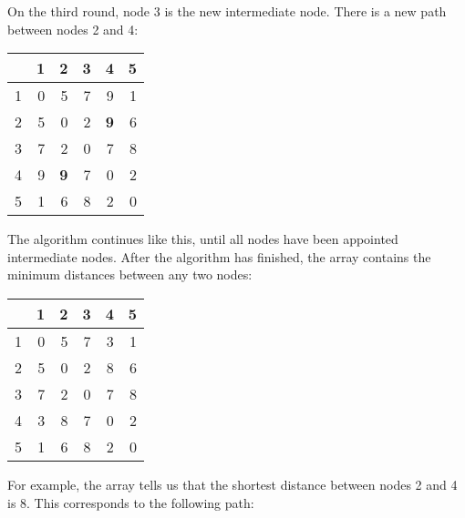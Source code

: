 On the third round, node 3 is the new intermediate node.
There is a new path between nodes 2 and 4:

\begin{center}
\begin{tabular}{r|rrrrr}
 & 1 & 2 & 3 & 4 & 5 \\
\hline
1 & 0 & 5 & 7 & 9 & 1 \\
2 & 5 & 0 & 2 & \textbf{9} & 6 \\
3 & 7 & 2 & 0 & 7 & 8 \\
4 & 9 & \textbf{9} & 7 & 0 & 2 \\
5 & 1 & 6 & 8 & 2 & 0 \\
\end{tabular}
\end{center}
\vspace{10pt}

The algorithm continues like this,
until all nodes have been appointed intermediate nodes.
After the algorithm has finished, the array contains
the minimum distances between any two nodes:

\begin{center}
\begin{tabular}{r|rrrrr}
 & 1 & 2 & 3 & 4 & 5 \\
\hline
1 & 0 & 5 & 7 & 3 & 1 \\
2 & 5 & 0 & 2 & 8 & 6 \\
3 & 7 & 2 & 0 & 7 & 8 \\
4 & 3 & 8 & 7 & 0 & 2 \\
5 & 1 & 6 & 8 & 2 & 0 \\
\end{tabular}
\end{center}

For example, the array tells us that the
shortest distance between nodes 2 and 4 is 8.
This corresponds to the following path:

\begin{center}
\end{center}

